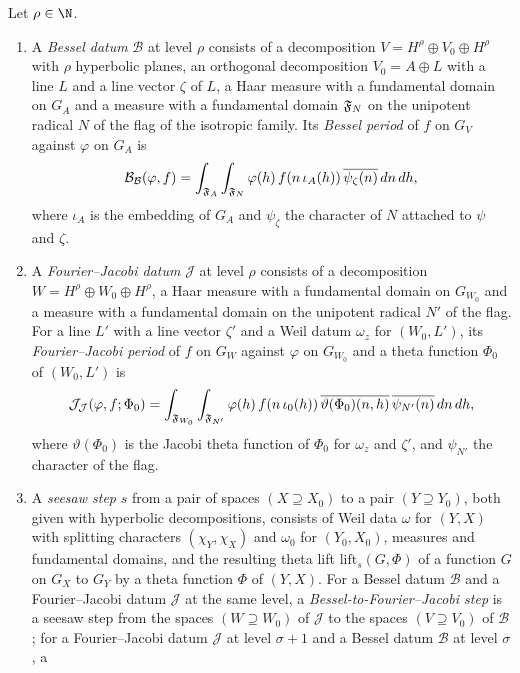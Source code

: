 \begin{definition}\label{pf:fs:seesaw}
Let $\rho\in\N$.
\begin{enumerate}[label=(\alph*)]
\item A \emph{Bessel datum} $\mathcal B$ at level $\rho$ consists of a decomposition $V=H^\rho\oplus V_0\oplus H^\rho$ with $\rho$ hyperbolic planes,
an orthogonal decomposition $V_0=A\oplus L$ with a line $L$ and a line vector $\zeta$ of $L$, a Haar measure with a fundamental domain on
$G_A$ and a measure with a fundamental domain $\mathfrak F_N$ on the unipotent radical $N$ of the flag of the isotropic family. Its \emph{Bessel
period} of $f$ on $G_V$ against $\varphi$ on $G_A$ is
\[
\mathcal B_{\mathcal B}(\varphi,f)=\int_{\mathfrak F_A}\int_{\mathfrak F_N}\varphi(h)\,f(n\,\iota_A(h))\,\overline{\psi_\zeta(n)}\,dn\,dh,
\]
where $\iota_A$ is the embedding of $G_A$ and $\psi_\zeta$ the character of $N$ attached to $\psi$ and $\zeta$.
\item A \emph{Fourier--Jacobi datum} $\mathcal J$ at level $\rho$ consists of a decomposition $W=H^\rho\oplus W_0\oplus H^\rho$, a Haar
measure with a fundamental domain on $G_{W_0}$ and a measure with a fundamental domain on the unipotent radical $N'$ of the flag. For a
line $L'$ with a line vector $\zeta'$ and a Weil datum $\omega_z$ for $(W_0,L')$, its \emph{Fourier--Jacobi period} of $f$ on $G_W$
against $\varphi$ on $G_{W_0}$ and a theta function $\Phi_0$ of $(W_0,L')$ is
\[
\mathcal J_{\mathcal J}(\varphi,f;\Phi_0)=\int_{\mathfrak F_{W_0}}\int_{\mathfrak F_{N'}}\varphi(h)\,f(n\,\iota_0(h))\,\overline{\vartheta(\Phi_0)(n,h)}\,
\overline{\psi_{N'}(n)}\,dn\,dh,
\]
where $\vartheta(\Phi_0)$ is the Jacobi theta function of $\Phi_0$ for $\omega_z$ and $\zeta'$, and $\psi_{N'}$ the character of the flag.
\item A \emph{seesaw step} $s$ from a pair of spaces $(X\supseteq X_0)$ to a pair $(Y\supseteq Y_0)$, both given with hyperbolic
decompositions, consists of Weil data $\omega$ for $(Y,X)$ with splitting characters $(\chi_Y,\chi_X)$ and $\omega_0$ for $(Y_0,X_0)$,
measures and fundamental domains, and the resulting theta lift $\mathrm{lift}_s(G,\Phi)$ of a function $G$ on $G_X$ to $G_Y$ by a theta
function $\Phi$ of $(Y,X)$. For a Bessel datum $\mathcal B$ and a Fourier--Jacobi datum $\mathcal J$ at the same level, a
\emph{Bessel-to-Fourier--Jacobi step} is a seesaw step from the spaces $(W\supseteq W_0)$ of $\mathcal J$ to the spaces $(V\supseteq V_0)$ of
$\mathcal B$; for a Fourier--Jacobi datum $\mathcal J$ at level $\sigma+1$ and a Bessel datum $\mathcal B$ at level $\sigma$, a

\end{enumerate}
\end{definition}
